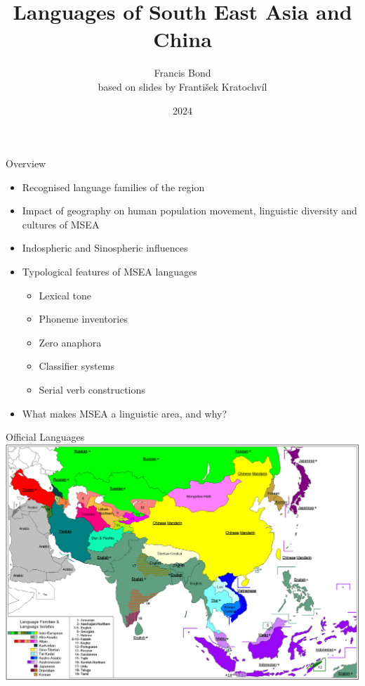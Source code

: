 \documentclass{beamer}
\title{Languages of South East Asia and China}
\author[Francis Bond]{Francis Bond \\ based on slides by František Kratochvíl}
\date{2024}
\begin{document}
\frame{\titlepage}

\begin{frame}{Overview}

\begin{itemize}
\item  Recognised language families of the region
\item Impact of geography on human population movement, linguistic diversity
and cultures of MSEA
\item Indospheric and Sinospheric influences

\item Typological features of MSEA languages
\begin{itemize}
\item Lexical tone
\item Phoneme inventories
\item Zero anaphora
\item Classifier systems
\item Serial verb constructions
\end{itemize}
\item What makes MSEA a linguistic area, and why?
\end{itemize}
\end{frame}

\begin{frame}{Official Languages}
\includegraphics[width=\textwidth]{pics/image1.png}
\end{frame}
\end{document}
